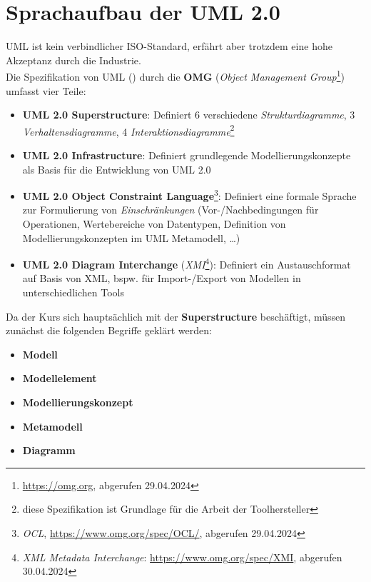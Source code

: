 \section{Sprachaufbau der UML 2.0}\label{sec:sprachaufbau-der-uml-2.0}

UML ist kein verbindlicher ISO-Standard, erfährt aber trotzdem eine hohe Akzeptanz durch die Industrie.\\

\noindent
Die Spezifikation von UML (\cite{OMG17}) durch die \textbf{OMG} (\textit{Object Management Group}\footnote{
    \url{https://omg.org}, abgerufen 29.04.2024
}) umfasst vier Teile:

\begin{itemize}
    \item \textbf{UML 2.0 Superstructure}: Definiert 6 verschiedene \textit{Strukturdiagramme}, 3 \textit{Verhaltensdiagramme}, 4 \textit{Interaktionsdiagramme}\footnote{
    diese Spezifikation ist Grundlage für die Arbeit der Toolhersteller
    }
    \item \textbf{UML 2.0 Infrastructure}: Definiert grundlegende Modellierungskonzepte als Basis für die Entwicklung von UML 2.0
    \item \textbf{UML 2.0 Object Constraint Language}\footnote{
    \textit{OCL}, \url{https://www.omg.org/spec/OCL/}, abgerufen 29.04.2024
    }: Definiert eine formale Sprache zur Formulierung von \textit{Einschränkungen} (Vor-/Nachbedingungen für Operationen, Wertebereiche von Datentypen, Definition von Modellierungskonzepten im UML Metamodell, \ldots)
    \item \textbf{UML 2.0 Diagram Interchange} (\textit{XMI}\footnote{
    \textit{XML Metadata Interchange}: \url{https://www.omg.org/spec/XMI}, abgerufen 30.04.2024
    }): Definiert ein Austauschformat auf Basis von XML, bspw. für Import-/Export von Modellen in unterschiedlichen Tools
\end{itemize}


\noindent
Da der Kurs sich hauptsächlich mit der \textbf{Superstructure} beschäftigt, müssen zunächst die folgenden Begriffe geklärt werden:

\begin{itemize}
    \item \textbf{Modell}
    \item \textbf{Modellelement}
    \item \textbf{Modellierungskonzept}
    \item \textbf{Metamodell}
    \item \textbf{Diagramm}
\end{itemize}

